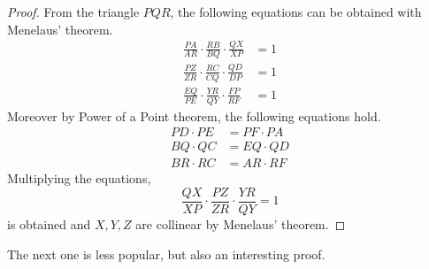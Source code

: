 \documentclass[../../../main.tex]{subfiles}
\begin{document}
\begin{proof}
From the triangle $PQR$, the following equations can be obtained with
Menelaus' theorem.
\begin{align*}
    \frac{PA}{AR} \cdot \frac{RB}{BQ} \cdot \frac{QX}{XP} &= 1 \\
    \frac{PZ}{ZR} \cdot \frac{RC}{CQ} \cdot \frac{QD}{DP} &= 1 \\
    \frac{EQ}{PE} \cdot \frac{YR}{QY} \cdot \frac{FP}{RF} &= 1
\end{align*}
Moreover by Power of a Point theorem, the following equations hold.
\begin{align*}
    PD \cdot PE &= PF \cdot PA \\
    BQ \cdot QC &= EQ \cdot QD \\
    BR \cdot RC &= AR \cdot RF
\end{align*}
Multiplying the equations,
\[
\frac{QX}{XP} \cdot \frac{PZ}{ZR} \cdot \frac{YR}{QY} = 1
\]
is obtained and $X, Y, Z$ are collinear by Menelaus' theorem.
\end{proof}

The next one is less popular, but also an interesting proof.
\end{document}
